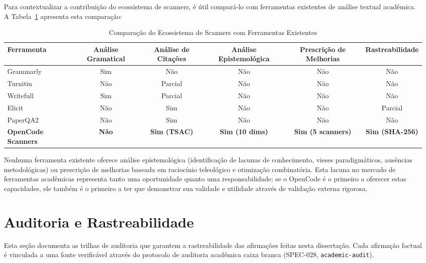Para contextualizar a contribuição do ecossistema de scanners, é útil compará-lo com ferramentas existentes de análise textual acadêmica. A Tabela~\ref{tab:comparacao-ferramentas} apresenta esta comparação:

\begin{table}[H]
\centering
\caption{Comparação do Ecossistema de Scanners com Ferramentas Existentes}
\label{tab:comparacao-ferramentas}
\begin{tabular}{p{2.5cm}ccccc}
\toprule
\textbf{Ferramenta} & \textbf{Análise Gramatical} & \textbf{Análise de Citações} & \textbf{Análise Epistemológica} & \textbf{Prescrição de Melhorias} & \textbf{Rastreabilidade} \\
\midrule
Grammarly & Sim & Não & Não & Não & Não \\
Turnitin & Não & Parcial & Não & Não & Não \\
Writefull & Sim & Parcial & Não & Não & Não \\
Elicit & Não & Sim & Não & Não & Parcial \\
PaperQA2 & Não & Sim & Não & Não & Não \\
\textbf{OpenCode Scanners} & \textbf{Não} & \textbf{Sim (TSAC)} & \textbf{Sim (10 dims)} & \textbf{Sim (5 scanners)} & \textbf{Sim (SHA-256)} \\
\bottomrule
\end{tabular}
\end{table}

Nenhuma ferramenta existente oferece análise epistemológica (identificação de lacunas de conhecimento, vieses paradigmáticos, ausências metodológicas) ou prescrição de melhorias baseada em raciocínio teleológico e otimização combinatória. Esta lacuna no mercado de ferramentas acadêmicas representa tanto uma oportunidade quanto uma responsabilidade: se o OpenCode é o primeiro a oferecer estas capacidades, ele também é o primeiro a ter que demonstrar sua validade e utilidade através de validação externa rigorosa.

\section{Auditoria e Rastreabilidade}

Esta seção documenta as trilhas de auditoria que garantem a rastreabilidade das afirmações feitas nesta dissertação. Cada afirmação factual é vinculada a uma fonte verificável através do protocolo de auditoria acadêmica caixa branca (SPEC-028, \texttt{academic-audit}).

